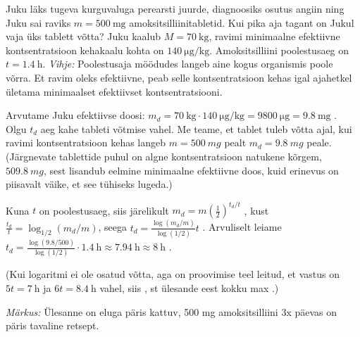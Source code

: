 
Juku läks tugeva kurguvaluga perearsti juurde, diagnoosiks osutus angiin ning Juku sai raviks $m= \SI{500}{\milli\gram}$ amoksitsilliinitabletid. Kui pika aja tagant on Jukul vaja üks tablett võtta? Juku kaalub $M= \SI{70}{\kilo\gram}$, ravimi minimaalne efektiivne kontsentratsioon kehakaalu kohta on $\SI{140}{\ug\per\kg}$. Amoksitsilliini poolestusaeg on $t= \SI{1.4}{\hour}$. \textit{Vihje:} Poolestusaja möödudes langeb aine kogus organismis poole võrra. Et ravim oleks efektiivne, peab selle kontsentratsioon kehas igal ajahetkel ületama minimaalset efektiivset kontsentratsiooni.


\hint

\solu
Arvutame Juku efektiivse doosi: $m_d = \SI{70}{\kilogram} \cdot \SI{140}{\micro\gram\per\kilogram} = \SI{9800}{\micro\gram} = \SI{9,8}{\milli\gram}$ . Olgu $t_d$ aeg kahe tableti võtmise vahel. Me teame, et tablet tuleb võtta ajal, kui ravimi kontsentratsioon kehas langeb $m = \SI{500}{mg}$ pealt $m_d = \SI{9.8}{mg}$ peale. (Järgnevate tablettide puhul on algne kontsentratsioon natukene kõrgem, $\SI{509.8}{mg}$, sest lisandub eelmine minimaalne efektiivne doos, kuid erinevus on piisavalt väike, et see tühiseks lugeda.)

Kuna $t$ on poolestusaeg, siis järelikult $m_d = m(\frac 12)^{t_d/t}$ , kust 
$\frac{t_d}{t} = \log_{1/2}(m_d/m)$, seega $t_d = \frac{\log(m_d/m)}{\log(1/2)}t$ . Arvuliselt leiame $t_d = \frac{\log(9.8/500)}{\log(1/2)}\cdot \SI{1.4}{\hour} \approx \SI{7.94}{\hour} \approx \SI{8}{\hour}$ .

(Kui logaritmi ei ole osatud võtta, aga on proovimise teel leitud, et vastus on $5t = \SI{7}{\hour}$ ja $6t=\SI{8.4}{\hour}$ vahel, siis , st ülesande eest kokku max .)

\textit{Märkus:} Ülesanne on eluga päris kattuv, 500 mg amoksitsilliini 3x päevas on päris tavaline retsept.
\probend